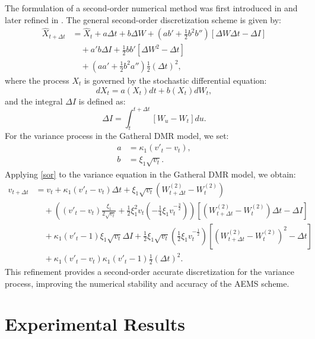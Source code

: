 \documentclass[graybox]{svmult}
\begin{document}
The formulation of a second-order numerical method was first introduced in \cite{mil1979method} and later refined in \cite{glasserman2004monte}. The general second-order discretization scheme is given by:
\begin{align}\label{sor}
    \hat{X}_{t+\Delta t} &= \hat{X}_t + a \Delta t + b \Delta W + (ab' + \tfrac{1}{2}b^2b'')[\Delta W \Delta t - \Delta I]\nonumber\\
    &\quad + a'b \Delta I + \tfrac{1}{2}bb'[\Delta W^2-\Delta t]\nonumber\\
    &\quad + (aa'+\tfrac{1}{2}b^2a'')\tfrac{1}{2}(\Delta t)^2,
\end{align}
where the process $X_t$ is governed by the stochastic differential equation:
\begin{equation*}
    dX_t = a(X_t)dt + b(X_t)dW_t,
\end{equation*}
and the integral $\Delta I$ is defined as:
\begin{equation*}
    \Delta I = \int^{t+\Delta t}_{t} [W_u - W_t]du.
\end{equation*}
For the variance process in the Gatheral DMR model, we set:
\begin{align*}
    a &= \kappa_1(v'_t - v_t), \\
    b &= \xi_1\sqrt{v_t}.
\end{align*}
Applying \eqref{sor} to the variance equation in the Gatheral DMR model, we obtain:
\begin{align*}\label{aems-sor}
    v_{t+\Delta t} &= v_t + \kappa_1(v'_t-v_t)\Delta t + \xi_1\sqrt{v_t}(W_{t+\Delta t}^{(2)}-W_t^{(2)})\nonumber\\
    &\quad +\left(\left(v'_t-v_t\right)\frac{\xi_1}{2\sqrt{v_t}}+\frac{1}{2}\xi_1^2v_t\left(-\frac{1}{4}\xi_1v_t^{-\frac{3}{2}}\right)\right)\left[\left(W_{t+\Delta t}^{(2)}-W_t^{(2)}\right)\Delta t - \Delta I\right]\nonumber\\
    &\quad +\kappa_1\left(v'_t-1\right)\xi_1\sqrt{v_t}\Delta I+\frac{1}{2}\xi_1\sqrt{v_t}\left(\frac{1}{2}\xi_1v_t^{-\frac{1}{2}}\right)\left[\left(W_{t+\Delta t}^{(2)}-W_t^{(2)}\right)^2-\Delta t\right]\nonumber\\
    &\quad +\kappa_1\left(v'_t-v_t\right)\kappa_1\left(v'_t-1\right)\frac{1}{2}(\Delta t)^2.
\end{align*}
This refinement provides a second-order accurate discretization for the variance process, improving the numerical stability and accuracy of the AEMS scheme.


\section{Experimental Results}
\label{sec:exp_results}
\end{document}

